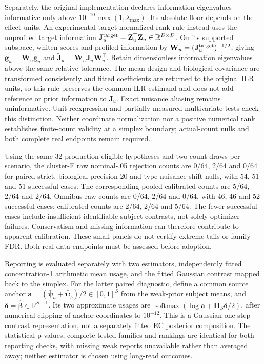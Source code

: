\documentclass[11pt]{article}
\begin{document}
Separately, the original implementation declares information eigenvalues informative only above \(10^{-10}\max(1,\lambda_{\max})\). Its absolute floor depends on the effect units. An experimental target-normalized rank rule instead uses the unprofiled target information \(\mathbf J_u^{\rm target}=\mathbf Z_u^\top\mathbf Z_u\in\mathbb R^{D\times D}\). On its supported subspace, whiten scores and profiled information by \(\mathbf W_u=(\mathbf J_u^{\rm target})^{-1/2}\), giving \(\widetilde{\mathbf g}_u=\mathbf W_u\mathbf g_u\) and \(\widetilde{\mathbf J}_u=\mathbf W_u\mathbf J_u\mathbf W_u^\top\). Retain dimensionless information eigenvalues above the same relative tolerance. The mean design and biological covariance are transformed consistently and fitted coefficients are returned to the original ILR units, so this rule preserves the common ILR estimand and does not add reference or prior information to \(\mathbf J_u\). Exact nuisance aliasing remains uninformative. Unit-reexpression and partially measured multivariate tests check this distinction. Neither coordinate normalization nor a positive numerical rank establishes finite-count validity at a simplex boundary; actual-count nulls and both complete real endpoints remain required.

Using the same 32 production-eligible hypotheses and two count draws per scenario, the cluster-F raw nominal-.05 rejection counts are 0/64, 2/64 and 0/64 for paired strict, biological-precision-20 and type-nuisance-shift nulls, with 54, 51 and 51 successful cases. The corresponding pooled-calibrated counts are 5/64, 2/64 and 2/64. Omnibus raw counts are 0/64, 2/64 and 0/64, with 46, 46 and 52 successful cases; calibrated counts are 2/64, 2/64 and 5/64. The fewer successful cases include insufficient identifiable subject contrasts, not solely optimizer failures. Conservatism and missing information can therefore contribute to apparent calibration. These small panels do not certify extreme tails or family FDR. Both real-data endpoints must be assessed before adoption.

Reporting is evaluated separately with two estimators, independently fitted concentration-1 arithmetic mean usage, and the fitted Gaussian contrast mapped back to the simplex. For the latter paired diagnostic, define a common source anchor \(\mathbf a=(\bar{\boldsymbol\psi}_a+\bar{\boldsymbol\psi}_b)/2\in[0,1]^S\) from the weak-prior subject means, and \(\boldsymbol\delta=\widehat{\boldsymbol\beta}\in\mathbb R^{S-1}\). Its two approximate usages are \(\operatorname{softmax}(\log\mathbf a\mp\mathbf H_S\boldsymbol\delta/2)\), after numerical clipping of anchor coordinates to \(10^{-12}\). This is a Gaussian one-step contrast representation, not a separately fitted EC posterior composition. The statistical p-values, complete tested families and rankings are identical for both reporting checks, with missing weak reports unavailable rather than averaged away; neither estimator is chosen using long-read outcomes.
\end{document}
